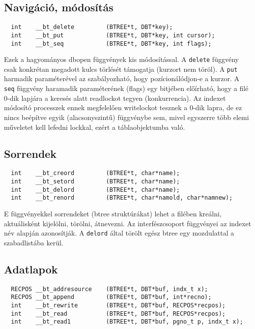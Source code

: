 \subsection{Navigáció, módosítás}

\begin{verbatim}
  int    __bt_delete         (BTREE*t, DBT*key);
  int    __bt_put            (BTREE*t, DBT*key, int cursor);
  int    __bt_seq            (BTREE*t, DBT*key, int flags);
\end{verbatim}

Ezek a hagyományos dbopen függvények kis módosítással.
A \verb!delete! függvény csak konkrétan megadott kulcs
törlését támogatja (kurzort nem töröl).
A \verb!put! harmadik paraméterével az szabályozható, 
hogy pozícionálódjon-e a kurzor.
A \verb!seq! függvény haramadik paraméterének (flags) egy bitjében
előírható, hogy a filé 0-dik lapjára a keresés alatt readlockot
tegyen (konkurrencia). Az indexet módosító processzek ennek megfelelően
writelockot tesznek a 0-dik lapra, de ez nincs beépítve
egyik (alacsonyszintű) függvénybe sem, mivel egyszerre több
elemi műveletet kell lefedni lockkal, ezért a táblaobjektumba való.
 
\subsection{Sorrendek}

\begin{verbatim}
  int    __bt_creord         (BTREE*t, char*name);
  int    __bt_setord         (BTREE*t, char*name);
  int    __bt_delord         (BTREE*t, char*name);
  int    __bt_renord         (BTREE*t, char*namold, char*namnew);
\end{verbatim}

E függvényekkel sorrendeket (btree struktúrákat) lehet a filében
kreálni, aktuálisként kijelölni, törölni, átnevezni.
Az interfészcsoport függvényei az indexet név alapján azonosítják. 
A \verb!delord! által törölt egész btree egy mozdulattal a
szabadlistába kerül. 
 

\subsection{Adatlapok}

\begin{verbatim}
  RECPOS __bt_addresource    (BTREE*t, DBT*buf, indx_t x);
  RECPOS __bt_append         (BTREE*t, DBT*buf, int*recno);
  int    __bt_rewrite        (BTREE*t, DBT*buf, RECPOS*recpos);
  int    __bt_read           (BTREE*t, DBT*buf, RECPOS*recpos);
  int    __bt_read1          (BTREE*t, DBT*buf, pgno_t p, indx_t x);
\end{verbatim}

